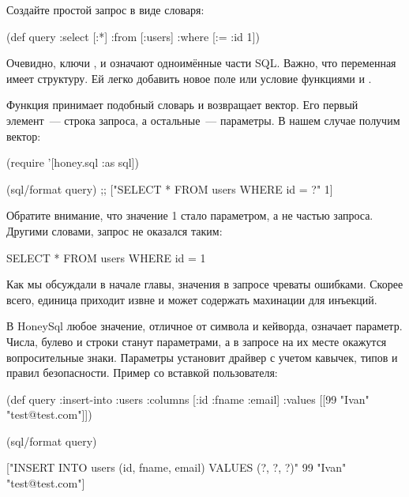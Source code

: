 \begin{english}
  \begin{clojure}
  \end{clojure}
\end{english}

Создайте простой запрос в виде словаря:

\begin{english}
  \begin{clojure}
(def query
  {:select [:*]
   :from [:users]
   :where [:= :id 1]})
  \end{clojure}
\end{english}

Очевидно, ключи ,  и  означают одноимённые части SQL. Важно, что переменная  имеет структуру. Ей легко добавить новое поле или условие функциями  и .

Функция  принимает подобный словарь и возвращает вектор. Его первый элемент~--- строка запроса, а остальные~--- параметры. В нашем случае получим вектор:

\begin{english}
  \begin{clojure}
(require '[honey.sql :as sql])

(sql/format query)
;; ["SELECT * FROM users WHERE id = ?" 1]
  \end{clojure}
\end{english}

Обратите внимание, что значение 1 стало параметром, а не частью запроса. Другими словами, запрос не оказался таким:

\begin{english}
  \begin{sql}
SELECT * FROM users WHERE id = 1
  \end{sql}
\end{english}

Как мы обсуждали в начале главы, значения в запросе чреваты ошибками. Скорее всего, единица приходит извне и может содержать махинации для инъекций.

В HoneySql любое значение, отличное от символа и кейворда, означает параметр. Числа, булево и строки станут параметрами, а в запросе на их месте окажутся вопросительные знаки. Параметры установит драйвер с учетом кавычек, типов и правил безопасности. Пример со вставкой пользователя:

\begin{english}
  \begin{clojure}
(def query
  {:insert-into :users
   :columns [:id :fname :email]
   :values [[99 "Ivan" "test@test.com"]]})

(sql/format query)

["INSERT INTO users (id, fname, email)
  VALUES (?, ?, ?)"
 99
 "Ivan"
 "test@test.com"]
  \end{clojure}
\end{english}

